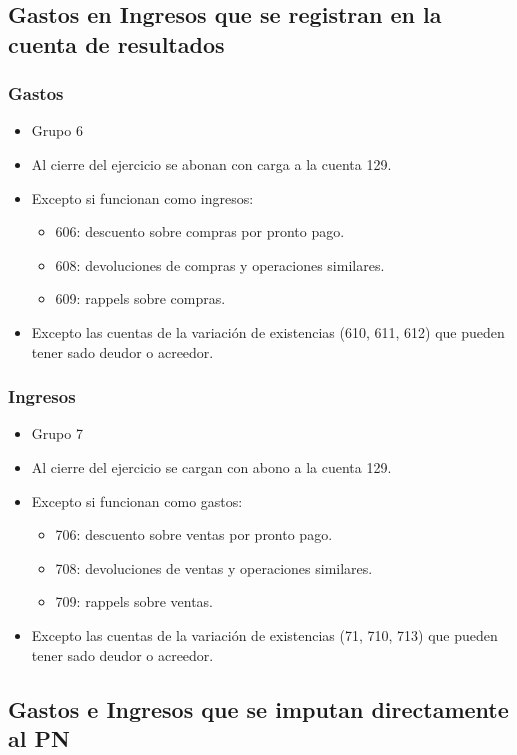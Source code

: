 \documentclass[a4paper,12pt]{article}
\begin{document}
\subsection{Gastos en Ingresos que se registran en la cuenta de resultados}

\subsubsection{Gastos}
\begin{itemize}
    \item Grupo 6
    \item Al cierre del ejercicio se abonan con carga a la cuenta 129.
    \item Excepto si funcionan como ingresos:
    \begin{itemize}
        \item 606: descuento sobre compras por pronto pago.
        \item 608: devoluciones de compras y operaciones similares.
        \item 609: rappels sobre compras.
    \end{itemize}
    \item Excepto las cuentas de la variación de existencias (610, 611, 612) que pueden tener sado deudor o acreedor.
\end{itemize}

\subsubsection{Ingresos}
\begin{itemize}
    \item Grupo 7
    \item Al cierre del ejercicio se cargan con abono a la cuenta 129.
    \item Excepto si funcionan como gastos:
    \begin{itemize}
        \item 706: descuento sobre ventas por pronto pago.
        \item 708: devoluciones de ventas y operaciones similares.
        \item 709: rappels sobre ventas.    
    \end{itemize}
    \item Excepto las cuentas de la variación de existencias (71, 710, 713) que pueden tener sado deudor o acreedor.
\end{itemize}

\subsection{Gastos e Ingresos que se imputan directamente al PN}
\end{document}
